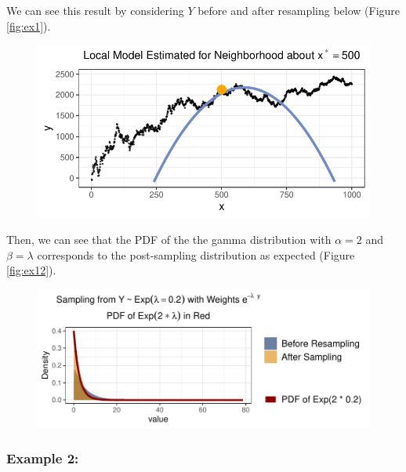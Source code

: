 \documentclass[12pt,twoside]{smiththesis}
\begin{document}
We can see this result by considering \(Y\) before and after resampling below (Figure \ref{fig:ex1}).
\begin{figure}

{\centering \includegraphics[width=1\linewidth]{thesis_files/figure-latex/unnamed-chunk-21-1} 

}

\caption{\label{fig:ex1}}\label{fig:unnamed-chunk-21}
\end{figure}
Then, we can see that the PDF of the the gamma distribution with \(\alpha = 2\) and \(\beta = \lambda\) corresponds to the post-sampling distribution as expected (Figure \ref{fig:ex12}).
\begin{figure}

{\centering \includegraphics[width=1\linewidth]{thesis_files/figure-latex/unnamed-chunk-22-1} 

}

\caption{\label{fig:ex12}}\label{fig:unnamed-chunk-22}
\end{figure}
\newpage

\hypertarget{example-2}{%
\subsubsection{Example 2:}\label{example-2}}
\end{document}

